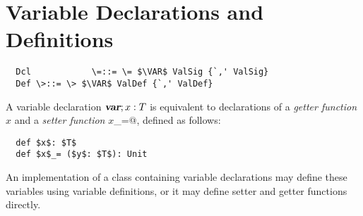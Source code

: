\documentclass[11pt]{report}
\newcommand{\iflet}[1]{}
\newcommand{\ifundefvar}[1]{}
\begin{document}
\iflet{
\section{Let Definitions}
\label{sec:letdef}

\syntax\begin{verbatim}
  PureDef      \=::= \= $\LET$ ValDef {`,' ValDef}
  ValDef       \>::= \> Id [`:' Type] `=' Expr
\end{verbatim}

A let definition $\LET;x: T = e$ defines $x$ as a name of the value
that results from the delayed evaluation of $e$. The type $T$ must be
a concrete value type (\sref{sec:types}) and the type of the
expression $e$ must conform to $T$. The effect of the let definition
is to bind the left-hand side $x$ to the result of evaluating $e$
converted to type $T$.  However, the expression $e$ is not evaluated
at the point of the let definition, but is instead evaluated the first
time $x$ is dereferenced during execution of the program (which might
be never at all). An attempt to dereference $x$ again in the course of
evaluation of $e$ leads to a run-time error.  Other threads trying to
dereference $x$ while $e$ is being evaluated block until evaluation is
complete.

The type $T$ may be omitted if it can be determined using local type
inference (\sref{sec:local-type-inf}).
}

\section{Variable Declarations and Definitions}
\label{sec:vardef}

\syntax\begin{verbatim}
  Dcl            \=::= \= $\VAR$ ValSig {`,' ValSig}
  Def \>::= \> $\VAR$ ValDef {`,' ValDef}
\end{verbatim}
\ifundefvar{
  PureDef \>::= \> $\VAR$ ValSig {`,' ValSig}
}

A variable declaration
$\mbox{\sl\bfseries var}; x: T$ is equivalent to declarations of a {\em getter function} $x$
and a {\em setter function} \verb@$x$_=@, defined as follows:

\begin{verbatim}
  def $x$: $T$
  def $x$_= ($y$: $T$): Unit
\end{verbatim}

An implementation of a class containing variable declarations
may define these variables using variable definitions, or it may
define setter and getter functions directly.
\end{document}
